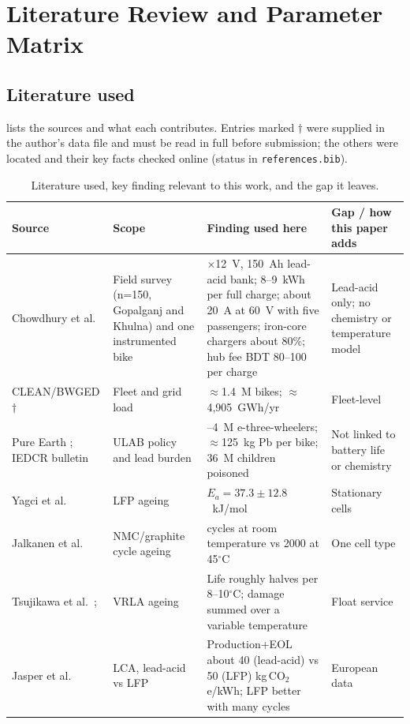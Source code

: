 \section{Literature Review and Parameter Matrix}
\subsection{Literature used}
 lists the sources and what each contributes. Entries marked $\dagger$ were supplied in the author's data file and must be read in full before submission; the others were located and their key facts checked online (status in \texttt{references.bib}).
\begin{table}[t]
\centering\footnotesize
\caption{Literature used, key finding relevant to this work, and the gap it leaves.}\label{tab:lit}
\renewcommand{\arraystretch}{1.15}
\begin{tabularx}{\textwidth}{>{\raggedright\arraybackslash}p{3.1cm}>{\raggedright\arraybackslash}p{3.3cm}>{\raggedright\arraybackslash}X>{\raggedright\arraybackslash}p{3.4cm}}
\toprule
Source & Scope & Finding used here & Gap / how this paper adds \\
\midrule
Chowdhury et al.\ \citep{chowdhury2026} & Field survey (n=150, Gopalganj and Khulna) and one instrumented bike & 5$\times$12~V, 150~Ah lead-acid bank; 8--9~kWh per full charge; about 20~A at 60~V with five passengers; iron-core chargers about 80\%; hub fee BDT 80--100 per charge & Lead-acid only; no chemistry or temperature model \\
CLEAN/BWGED \citep{clean2024}$\dagger$ & Fleet and grid load & $\approx$1.4~M bikes; $\approx$4{,}905~GWh/yr & Fleet-level \\
Pure Earth \citep{pureearth_smep}; IEDCR bulletin \citep{das2026} & ULAB policy and lead burden & 3--4~M e-three-wheelers; $\approx$125~kg Pb per bike; 36~M children poisoned & Not linked to battery life or chemistry \\
Yagci et al.\ \citep{yagci2026} & LFP ageing & $E_a=37.3\pm12.8$~kJ/mol & Stationary cells \\
Jalkanen et al.\ \citep{jalkanen2015} & NMC/graphite cycle ageing & 2600 cycles at room temperature vs 2000 at 45$^\circ$C & One cell type \\
Tsujikawa et al.\ \citep{tsujikawa2009}; \citep{bu806a} & VRLA ageing & Life roughly halves per 8--10$^\circ$C; damage summed over a variable temperature & Float service \\
Jasper et al.\ \citep{jasper2025} & LCA, lead-acid vs LFP & Production+EOL about 40 (lead-acid) vs 50 (LFP) kg\,CO$_2$e/kWh; LFP better with many cycles & European data \\

\end{tabularx}
\end{table}
